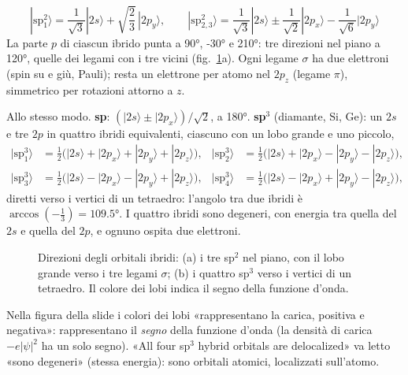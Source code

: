 \documentclass[11pt,a4paper]{article}
\begin{document}
\begin{chiave}
\[
|\mathrm{sp}^2_1\rangle=\frac1{\sqrt3}|2s\rangle+\sqrt{\frac23}\,|2p_y\rangle,\qquad
|\mathrm{sp}^2_{2,3}\rangle=\frac1{\sqrt3}|2s\rangle\pm\frac1{\sqrt2}|2p_x\rangle-\frac1{\sqrt6}|2p_y\rangle
\]
La parte $p$ di ciascun ibrido punta a \ang{90}, \ang{-30} e \ang{210}: tre direzioni nel piano a \ang{120}, quelle dei legami con i tre vicini
(fig.~\ref{fig:ibridi}a). Ogni legame $\sigma$ ha due elettroni (spin su e giù, Pauli); resta un elettrone per atomo nel $2p_z$ (legame $\pi$),
simmetrico per rotazioni attorno a $z$.
\end{chiave}

Allo stesso modo. \textbf{sp}: $(|2s\rangle\pm|2p_x\rangle)/\sqrt2$, a \ang{180}. \textbf{sp$^3$} (diamante, Si, Ge): un $2s$ e tre $2p$ in quattro ibridi
equivalenti, ciascuno con un lobo grande e uno piccolo,
\begin{align*}
|\mathrm{sp}^3_1\rangle&=\tfrac12\bigl(|2s\rangle+|2p_x\rangle+|2p_y\rangle+|2p_z\rangle\bigr), &
|\mathrm{sp}^3_2\rangle&=\tfrac12\bigl(|2s\rangle+|2p_x\rangle-|2p_y\rangle-|2p_z\rangle\bigr),\\
|\mathrm{sp}^3_3\rangle&=\tfrac12\bigl(|2s\rangle-|2p_x\rangle-|2p_y\rangle+|2p_z\rangle\bigr), &
|\mathrm{sp}^3_4\rangle&=\tfrac12\bigl(|2s\rangle-|2p_x\rangle+|2p_y\rangle-|2p_z\rangle\bigr),
\end{align*}
diretti verso i vertici di un tetraedro: l'angolo tra due ibridi è $\arccos(-\tfrac13)=\ang{109.5}$. I quattro ibridi sono degeneri, con energia
tra quella del $2s$ e quella del $2p$, e ognuno ospita due elettroni.

\begin{figure}[tbp]
\centering{}
\caption{Direzioni degli orbitali ibridi: (a) i tre sp$^2$ nel piano, con il lobo grande verso i tre legami $\sigma$; (b) i quattro sp$^3$ verso i vertici
di un tetraedro. Il colore dei lobi indica il segno della funzione d'onda.}\label{fig:ibridi}
\end{figure}

\begin{osservazione}[slide 38]
Nella figura della slide i colori dei lobi «rappresentano la carica, positiva e negativa»: rappresentano il \emph{segno} della funzione d'onda (la
densità di carica $-e|\psi|^2$ ha un solo segno). «All four sp$^3$ hybrid orbitals are delocalized» va letto «sono degeneri» (stessa energia): sono
orbitali atomici, localizzati sull'atomo.
\end{osservazione}
\end{document}
